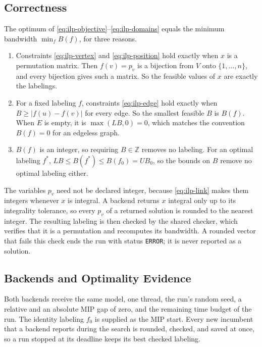 \subsection{Correctness}\label{sec:ilp-correctness}

The optimum of \eqref{eq:ilp-objective}--\eqref{eq:ilp-domains} equals the minimum bandwidth $\min_f B(f)$, for three reasons.
\begin{enumerate}
\item Constraints \eqref{eq:ilp-vertex} and \eqref{eq:ilp-position} hold exactly when $x$ is a permutation matrix. Then $f(v) = p_v$ is a bijection from $V$ onto $\{1, \ldots, n\}$, and every bijection gives such a matrix. So the feasible values of $x$ are exactly the labelings.
\item For a fixed labeling $f$, constraints \eqref{eq:ilp-edge} hold exactly when $B \ge |f(u) - f(v)|$ for every edge. So the smallest feasible $B$ is $B(f)$. When $E$ is empty, it is $\max(LB, 0) = 0$, which matches the convention $B(f) = 0$ for an edgeless graph.
\item $B(f)$ is an integer, so requiring $B \in \mathbb{Z}$ removes no labeling. For an optimal labeling $f^*$, $LB \le B(f^*) \le B(f_0) = UB_0$, so the bounds on $B$ remove no optimal labeling either.
\end{enumerate}
The variables $p_v$ need not be declared integer, because \eqref{eq:ilp-link} makes them integers whenever $x$ is integral. A backend returns $x$ integral only up to its integrality tolerance, so every $p_v$ of a returned solution is rounded to the nearest integer. The resulting labeling is then checked by the shared checker, which verifies that it is a permutation and recomputes its bandwidth. A rounded vector that fails this check ends the run with status \texttt{ERROR}; it is never reported as a solution.

\subsection{Backends and Optimality Evidence}\label{sec:ilp-backends}

Both backends receive the same model, one thread, the run's random seed, a relative and an absolute MIP gap of zero, and the remaining time budget of the run. The identity labeling $f_0$ is supplied as the MIP start. Every new incumbent that a backend reports during the search is rounded, checked, and saved at once, so a run stopped at its deadline keeps its best checked labeling.

